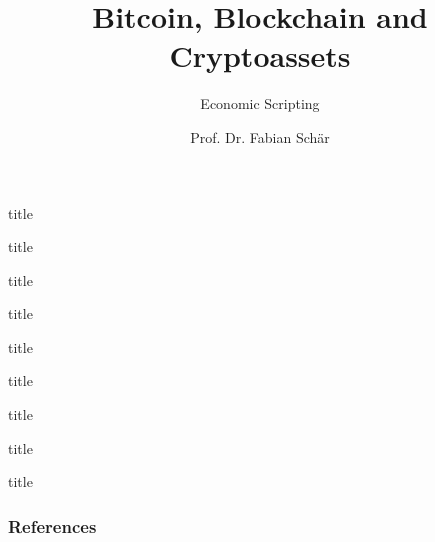 \documentclass[]{beamer}
\title{Bitcoin, Blockchain and Cryptoassets}
\subtitle{Economic Scripting}
\author{Prof. Dr. Fabian Schär}
\institute{University of Basel}
\begin{document}
\thispagestyle{empty}
\begin{frame}[noframenumbering]
	\titlepage
\end{frame}


\begin{frame}{title}
	
\end{frame}


\begin{frame}{title}
	
\end{frame}


\begin{frame}{title}
	
\end{frame}


\begin{frame}{title}
	
\end{frame}


\begin{frame}{title}
	
\end{frame}


\begin{frame}{title}
	
\end{frame}


\begin{frame}{title}
	
\end{frame}


\begin{frame}{title}
	
\end{frame}


\begin{frame}{title}
	
\end{frame}


\begin{frame}%
	\frametitle{References}
	
	
\end{frame}
\end{document}
